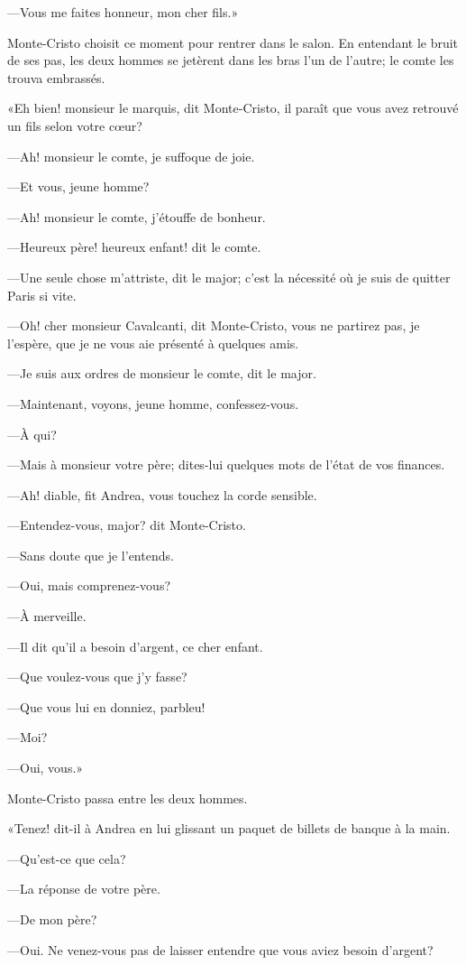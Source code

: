 —Vous me faites honneur, mon cher fils.» 

Monte-Cristo choisit ce moment pour rentrer dans le salon. En entendant le bruit de ses pas, les deux hommes se jetèrent dans les bras l'un de l'autre; le comte les trouva embrassés. 

«Eh bien! monsieur le marquis, dit Monte-Cristo, il paraît que vous avez retrouvé un fils selon votre cœur? 

—Ah! monsieur le comte, je suffoque de joie. 

—Et vous, jeune homme? 

—Ah! monsieur le comte, j'étouffe de bonheur. 

—Heureux père! heureux enfant! dit le comte. 

—Une seule chose m'attriste, dit le major; c'est la nécessité où je suis de quitter Paris si vite. 

—Oh! cher monsieur Cavalcanti, dit Monte-Cristo, vous ne partirez pas, je l'espère, que je ne vous aie présenté à quelques amis. 

—Je suis aux ordres de monsieur le comte, dit le major. 

—Maintenant, voyons, jeune homme, confessez-vous. 

—À qui? 

—Mais à monsieur votre père; dites-lui quelques mots de l'état de vos finances. 

—Ah! diable, fit Andrea, vous touchez la corde sensible. 

—Entendez-vous, major? dit Monte-Cristo. 

—Sans doute que je l'entends. 

—Oui, mais comprenez-vous? 

—À merveille. 

—Il dit qu'il a besoin d'argent, ce cher enfant. 

—Que voulez-vous que j'y fasse? 

—Que vous lui en donniez, parbleu! 

—Moi? 

—Oui, vous.» 

Monte-Cristo passa entre les deux hommes. 

«Tenez! dit-il à Andrea en lui glissant un paquet de billets de banque à la main. 

—Qu'est-ce que cela? 

—La réponse de votre père. 

—De mon père? 

—Oui. Ne venez-vous pas de laisser entendre que vous aviez besoin d'argent? 

